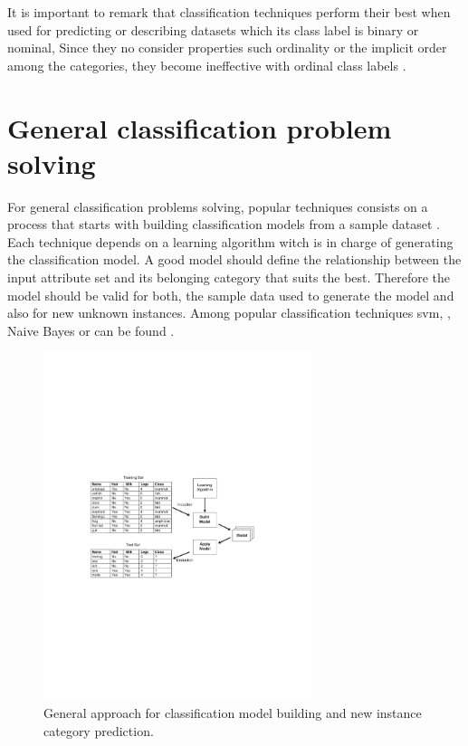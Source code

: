It is important to remark that classification techniques perform their best when used for predicting or describing datasets which its class label is binary or nominal, Since they no consider properties such ordinality or the implicit order among the categories, they become ineffective with ordinal class labels \cite{frank2001simple}.

\section{General classification problem solving}

For general classification problems solving, popular techniques consists on a process that starts with building classification models from a sample dataset \cite{witten2005data}. Each technique depends on a learning algorithm witch is in charge of generating the classification model. A good model should define the relationship between the input attribute set and its belonging category that suits the best. Therefore the model should be valid for both, the sample data used to generate the model and also for new unknown instances. Among popular classification techniques \acrfull{svm}, , Naive Bayes or  can be found \cite{garje2016sentiment}.

\begin{figure}[!htp]
  \center
  \includegraphics[width=0.7\textwidth]{figures/classification_problem_solving}
  \caption{General approach for classification model building and new instance category prediction.}
  \label{fig:classification_problem}
\end{figure}

